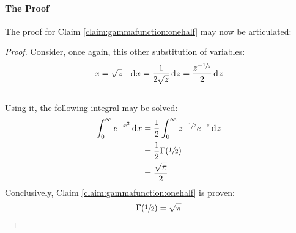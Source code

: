 \documentclass[12pt]{article}
\begin{document}
\paragraph{The Proof}
The proof for Claim \ref{claim:gammafunction:onehalf} may now be articulated:\\[-36pt]
\begin{proof}
	Consider, once again, this other substitution of variables:\\[-36pt]
	\begin{align*}
		x = \sqrt{z}	&&	\mathop{}\!\mathrm{d^{}}x = \frac{1}{2\sqrt{z}}\mathop{}\!\mathrm{d^{}}z = \frac{z^{-\sfrac{1}{2}}}{2}\mathop{}\!\mathrm{d^{}}z
	\end{align*}\\[-36pt]
	Using it, the following integral may be solved:
	\begin{equation}
		\begin{split}
			\int^\infty_0 e^{-x^2}\mathop{}\!\mathrm{d^{}}x	&=	\frac{1}{2}\int^\infty_0 z^{-\sfrac{1}{2}}e^{-z}\mathop{}\!\mathrm{d^{}}z\\
											&=	\frac{1}{2}\Gamma(\sfrac{1}{2})\\
											&=	\frac{\sqrt{\pi}}{2}
		\end{split}
	\end{equation}
	Conclusively, Claim \ref{claim:gammafunction:onehalf} is proven:
	\begin{equation}
		\Gamma(\sfrac{1}{2}) = \sqrt{\pi}
	\end{equation}
\end{proof}



\pagebreak
\end{document}
